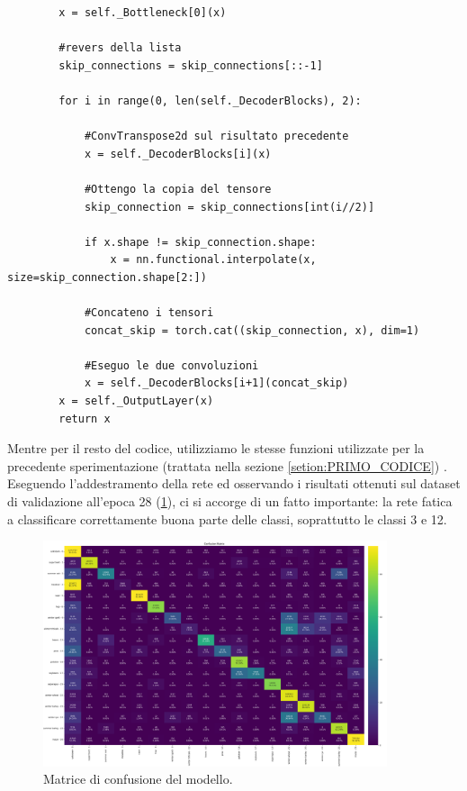 \begin{lstlisting}
        x = self._Bottleneck[0](x)

        #revers della lista 
        skip_connections = skip_connections[::-1]

        for i in range(0, len(self._DecoderBlocks), 2):
        
            #ConvTranspose2d sul risultato precedente
            x = self._DecoderBlocks[i](x)
            
            #Ottengo la copia del tensore
            skip_connection = skip_connections[int(i//2)]
            
            if x.shape != skip_connection.shape:
                x = nn.functional.interpolate(x, size=skip_connection.shape[2:])

            #Concateno i tensori
            concat_skip = torch.cat((skip_connection, x), dim=1)
            
            #Eseguo le due convoluzioni 
            x = self._DecoderBlocks[i+1](concat_skip)
        x = self._OutputLayer(x)
        return x

\end{lstlisting}
Mentre per il resto del codice, utilizziamo le stesse funzioni utilizzate per la precedente 
sperimentazione (trattata nella sezione \ref{setion:PRIMO_CODICE}) .
Eseguendo l'addestramento della rete ed osservando i risultati ottenuti sul dataset di 
validazione all'epoca 28 (\ref{fig:UNET_2D_noWeights_confusionMatrix}), ci si accorge 
di un fatto importante:  la rete fatica a classificare correttamente buona parte delle 
classi, soprattutto le classi 3 e 12.


\begin{figure}[H]
    \centering
    \includegraphics[angle=270,origin=c,width=0.9\textwidth]{Immagini/sperimentazione/UNET_2D_noWeights_confusionMatrix_edit.png}
    \caption{Matrice di confusione del modello.}
    \label{fig:UNET_2D_noWeights_confusionMatrix}

\end{figure} 


